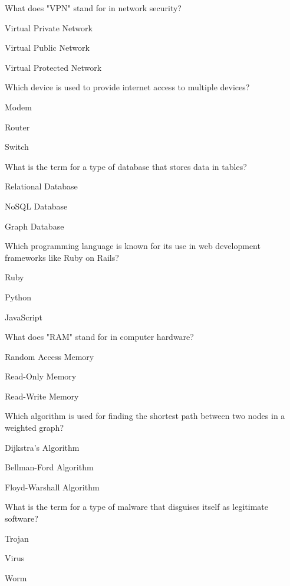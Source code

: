 \begin{enhancedmcq}{What does "VPN" stand for in network security?}
\item Virtual Private Network
\item Virtual Public Network
\item Virtual Protected Network

\end{enhancedmcq}
\begin{enhancedmcq}{Which device is used to provide internet access to multiple devices?}
\item Modem
\item Router
\item Switch

\end{enhancedmcq}
\begin{enhancedmcq}{What is the term for a type of database that stores data in tables?}
\item Relational Database
\item NoSQL Database
\item Graph Database

\end{enhancedmcq}
\begin{enhancedmcq}{Which programming language is known for its use in web development frameworks like Ruby on Rails?}
\item Ruby
\item Python
\item JavaScript

\end{enhancedmcq}
\begin{enhancedmcq}{What does "RAM" stand for in computer hardware?}
\item Random Access Memory
\item Read-Only Memory
\item Read-Write Memory

\end{enhancedmcq}
\begin{enhancedmcq}{Which algorithm is used for finding the shortest path between two nodes in a weighted graph?}
\item Dijkstra's Algorithm
\item Bellman-Ford Algorithm
\item Floyd-Warshall Algorithm

\end{enhancedmcq}
\begin{enhancedmcq}{What is the term for a type of malware that disguises itself as legitimate software?}
\item Trojan
\item Virus
\item Worm

\end{enhancedmcq}
